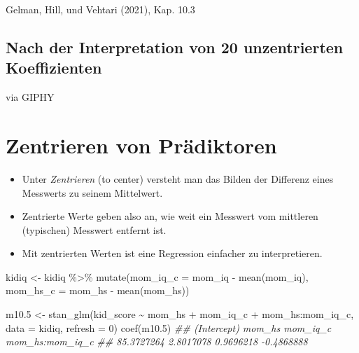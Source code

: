 \documentclass[
  a4paper,
  DIV=11]{scrreprt}
\newenvironment{Shaded}{\begin{snugshade}}{\end{snugshade}}
\newcommand{\AttributeTok}[1]{\textcolor[rgb]{0.40,0.45,0.13}{#1}}
\newcommand{\DecValTok}[1]{\textcolor[rgb]{0.68,0.00,0.00}{#1}}
\newcommand{\DocumentationTok}[1]{\textcolor[rgb]{0.37,0.37,0.37}{\textit{#1}}}
\newcommand{\FloatTok}[1]{\textcolor[rgb]{0.68,0.00,0.00}{#1}}
\newcommand{\FunctionTok}[1]{\textcolor[rgb]{0.28,0.35,0.67}{#1}}
\newcommand{\NormalTok}[1]{\textcolor[rgb]{0.00,0.23,0.31}{#1}}
\newcommand{\OtherTok}[1]{\textcolor[rgb]{0.00,0.23,0.31}{#1}}
\newcommand{\SpecialCharTok}[1]{\textcolor[rgb]{0.37,0.37,0.37}{#1}}
\providecommand{\tightlist}{%
  \setlength{\itemsep}{0pt}\setlength{\parskip}{0pt}}\usepackage{longtable,booktabs,array}
\theoremstyle{definition}
\theoremstyle{remark}
\begin{document}
Gelman, Hill, und Vehtari (2021), Kap. 10.3

\hypertarget{nach-der-interpretation-von-20-unzentrierten-koeffizienten}{%
\subsection{Nach der Interpretation von 20 unzentrierten
Koeffizienten}\label{nach-der-interpretation-von-20-unzentrierten-koeffizienten}}

via GIPHY

\hypertarget{zentrieren-von-pruxe4diktoren}{%
\section{Zentrieren von
Prädiktoren}\label{zentrieren-von-pruxe4diktoren}}

\begin{itemize}
\tightlist
\item
  Unter \emph{Zentrieren} (to center) versteht man das Bilden der
  Differenz eines Messwerts zu seinem Mittelwert.
\item
  Zentrierte Werte geben also an, wie weit ein Messwert vom mittleren
  (typischen) Messwert entfernt ist.
\item
  Mit zentrierten Werten ist eine Regression einfacher zu
  interpretieren.
\end{itemize}

\begin{Shaded}
\begin{Highlighting}[]
\NormalTok{kidiq }\OtherTok{\textless{}{-}}
\NormalTok{  kidiq }\SpecialCharTok{\%\textgreater{}\%} 
  \FunctionTok{mutate}\NormalTok{(}\AttributeTok{mom\_iq\_c =}\NormalTok{ mom\_iq }\SpecialCharTok{{-}} \FunctionTok{mean}\NormalTok{(mom\_iq),}
         \AttributeTok{mom\_hs\_c =}\NormalTok{ mom\_hs }\SpecialCharTok{{-}} \FunctionTok{mean}\NormalTok{(mom\_hs))}
\end{Highlighting}
\end{Shaded}

\begin{Shaded}
\begin{Highlighting}[]
\NormalTok{m10}\FloatTok{.5} \OtherTok{\textless{}{-}} \FunctionTok{stan\_glm}\NormalTok{(kid\_score }\SpecialCharTok{\textasciitilde{}}\NormalTok{ mom\_hs }\SpecialCharTok{+}\NormalTok{ mom\_iq\_c }\SpecialCharTok{+}\NormalTok{ mom\_hs}\SpecialCharTok{:}\NormalTok{mom\_iq\_c, }
                  \AttributeTok{data =}\NormalTok{ kidiq, }
                  \AttributeTok{refresh =} \DecValTok{0}\NormalTok{)}
\FunctionTok{coef}\NormalTok{(m10}\FloatTok{.5}\NormalTok{)}
\DocumentationTok{\#\#     (Intercept)          mom\_hs        mom\_iq\_c mom\_hs:mom\_iq\_c }
\DocumentationTok{\#\#      85.3727264       2.8017078       0.9696218      {-}0.4868888}
\end{Highlighting}
\end{Shaded}
\end{document}
